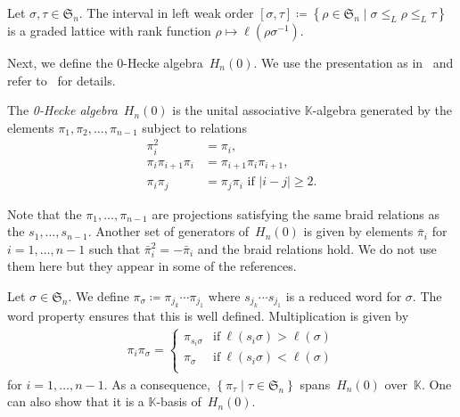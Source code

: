 \documentclass[ALCO,ThmDefs,Unicode,epreuves]{cedram}
\newcommand{\K}{\mathbb K}
\newcommand{\set}[1]{\left\{ #1 \right\}}
\newcommand{\fS}{\mathfrak{S}}
\newcommand{\fs}{s}
\newcommand{\He}{H_n(0)}
\begin{document}
\begin{thm}
	\label{thm:bruhat_interval}
	Let $\sigma,\tau\in \fS_n$. The interval in left weak order $[\sigma, \tau] \coloneqq \left\{\rho \in \fS_n \mid \sigma \leq_L \rho \leq_L \tau \right\}$ is a graded lattice with rank function $\rho \mapsto \ell(\rho \sigma^{-1})$.
\end{thm}
 
Next, we define the 0-Hecke algebra~$\He$. We use the presentation as in~\cite{Tewari2015} and refer to~\cite[Ch.~1]{Mathas1999} for details.

\begin{defi}
	\label{thm:0-Hecke algebra}
	The \emph{0-Hecke algebra}~$\He$ is the unital associative $\K$-algebra generated by the elements $\pi_1,\pi_2,\dots ,\pi_{n-1}$ subject to relations
	\begin{align*}
	\pi_i^2 &= \pi_i, \\
	\pi_i\pi_{i+1}\pi_i &= \pi_{i+1} \pi_{i} \pi_{i+1}, \\
	\pi_i \pi_j &= \pi_j \pi_i \text{ if } |i-j| \geq 2. 	 
	\end{align*}
\end{defi}

Note that the $\pi_1,\dots, \pi_{n-1}$ are projections satisfying the same braid relations as the $s_1, \ldots, s_{n-1}$.
Another set of generators of~$\He$ is given by elements $\bar \pi_i$ for $i=1,\dots, n-1$ such that $\bar \pi_i^2 = - \bar \pi_i$ and the braid relations hold.
We do not use them here but they appear in some of the references.

Let $\sigma \in \fS_n$. We define $\pi_\sigma \coloneqq \pi_{j_k} \cdots \pi_{j_1}$ where $\fs_{j_k} \cdots \fs_{j_1}$ is a reduced word for $\sigma$. The word property ensures that this is well defined. Multiplication is given by
\begin{align*}
\pi_i \pi_\sigma = 
\begin{cases}
\pi_{\fs_i \sigma} & \text{if}\ \ell(\fs_i \sigma ) > \ell(\sigma) \\
\pi_{\sigma} & \text{if}\ \ell(\fs_i \sigma ) < \ell(\sigma) \\
\end{cases}
\end{align*}
for $i = 1,\dots, n-1$. 
As a consequence, $\set{\pi_{\tau} \mid \tau \in \fS_n}$ spans~$\He$ over~$\K$. One can also show that it is a $\K$-basis of~$\He$.%
\end{document}
